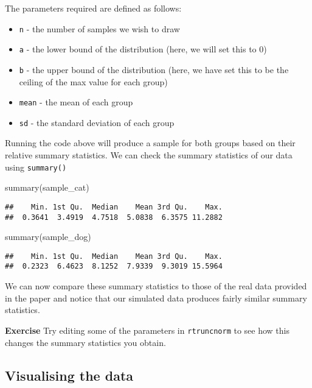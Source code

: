 \documentclass[
]{book}
\newenvironment{Shaded}{\begin{snugshade}}{\end{snugshade}}
\newcommand{\FunctionTok}[1]{\textcolor[rgb]{0.00,0.00,0.00}{#1}}
\newcommand{\NormalTok}[1]{#1}
\providecommand{\tightlist}{%
  \setlength{\itemsep}{0pt}\setlength{\parskip}{0pt}}
\begin{document}
The parameters required are defined as follows:

\begin{itemize}
\tightlist
\item
  \texttt{n} - the number of samples we wish to draw
\item
  \texttt{a} - the lower bound of the distribution (here, we will set this to 0)
\item
  \texttt{b} - the upper bound of the distribution (here, we have set this to be the ceiling of the max value for each group)
\item
  \texttt{mean} - the mean of each group
\item
  \texttt{sd} - the standard deviation of each group
\end{itemize}

Running the code above will produce a sample for both groups based on their relative summary statistics. We can check the summary statistics of our data using \texttt{summary()}

\begin{Shaded}
\begin{Highlighting}[]
\FunctionTok{summary}\NormalTok{(sample\_cat)}
\end{Highlighting}
\end{Shaded}

\begin{verbatim}
##    Min. 1st Qu.  Median    Mean 3rd Qu.    Max. 
##  0.3641  3.4919  4.7518  5.0838  6.3575 11.2882
\end{verbatim}

\begin{Shaded}
\begin{Highlighting}[]
\FunctionTok{summary}\NormalTok{(sample\_dog)}
\end{Highlighting}
\end{Shaded}

\begin{verbatim}
##    Min. 1st Qu.  Median    Mean 3rd Qu.    Max. 
##  0.2323  6.4623  8.1252  7.9339  9.3019 15.5964
\end{verbatim}

We can now compare these summary statistics to those of the real data provided in the paper and notice that our simulated data produces fairly similar summary statistics.

\textbf{Exercise}
Try editing some of the parameters in \texttt{rtruncnorm} to see how this changes the summary statistics you obtain.

\hypertarget{visualising-the-data}{%
\subsection{Visualising the data}\label{visualising-the-data}}
\end{document}
